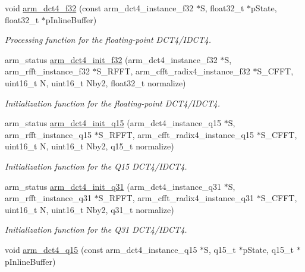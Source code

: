 \begin{DoxyCompactItemize}
\item 
void \hyperlink{group__DCT4__IDCT4_gafd538d68886848bc090ec2b0d364cc81}{arm\+\_\+dct4\+\_\+f32} (const arm\+\_\+dct4\+\_\+instance\+\_\+f32 $\ast$S, float32\+\_\+t $\ast$p\+State, float32\+\_\+t $\ast$p\+Inline\+Buffer)
\begin{DoxyCompactList}\small\item\em Processing function for the floating-\/point D\+C\+T4/\+I\+D\+C\+T4. \end{DoxyCompactList}\item 
arm\+\_\+status \hyperlink{group__DCT4__IDCT4_gab094ad3bc6fa1b84e8b12a24e1850a06}{arm\+\_\+dct4\+\_\+init\+\_\+f32} (arm\+\_\+dct4\+\_\+instance\+\_\+f32 $\ast$S, arm\+\_\+rfft\+\_\+instance\+\_\+f32 $\ast$S\+\_\+\+R\+F\+FT, arm\+\_\+cfft\+\_\+radix4\+\_\+instance\+\_\+f32 $\ast$S\+\_\+\+C\+F\+FT, uint16\+\_\+t N, uint16\+\_\+t Nby2, float32\+\_\+t normalize)
\begin{DoxyCompactList}\small\item\em Initialization function for the floating-\/point D\+C\+T4/\+I\+D\+C\+T4. \end{DoxyCompactList}\item 
arm\+\_\+status \hyperlink{group__DCT4__IDCT4_ga966fd1b66a80873964533703ab5dc054}{arm\+\_\+dct4\+\_\+init\+\_\+q15} (arm\+\_\+dct4\+\_\+instance\+\_\+q15 $\ast$S, arm\+\_\+rfft\+\_\+instance\+\_\+q15 $\ast$S\+\_\+\+R\+F\+FT, arm\+\_\+cfft\+\_\+radix4\+\_\+instance\+\_\+q15 $\ast$S\+\_\+\+C\+F\+FT, uint16\+\_\+t N, uint16\+\_\+t Nby2, q15\+\_\+t normalize)
\begin{DoxyCompactList}\small\item\em Initialization function for the Q15 D\+C\+T4/\+I\+D\+C\+T4. \end{DoxyCompactList}\item 
arm\+\_\+status \hyperlink{group__DCT4__IDCT4_ga631bb59c7c97c814ff7147ecba6a716a}{arm\+\_\+dct4\+\_\+init\+\_\+q31} (arm\+\_\+dct4\+\_\+instance\+\_\+q31 $\ast$S, arm\+\_\+rfft\+\_\+instance\+\_\+q31 $\ast$S\+\_\+\+R\+F\+FT, arm\+\_\+cfft\+\_\+radix4\+\_\+instance\+\_\+q31 $\ast$S\+\_\+\+C\+F\+FT, uint16\+\_\+t N, uint16\+\_\+t Nby2, q31\+\_\+t normalize)
\begin{DoxyCompactList}\small\item\em Initialization function for the Q31 D\+C\+T4/\+I\+D\+C\+T4. \end{DoxyCompactList}\item 
void \hyperlink{group__DCT4__IDCT4_ga114cb9635059f678df291fcc887aaf2b}{arm\+\_\+dct4\+\_\+q15} (const arm\+\_\+dct4\+\_\+instance\+\_\+q15 $\ast$S, q15\+\_\+t $\ast$p\+State, q15\+\_\+t $\ast$p\+Inline\+Buffer)

\end{DoxyCompactItemize}
